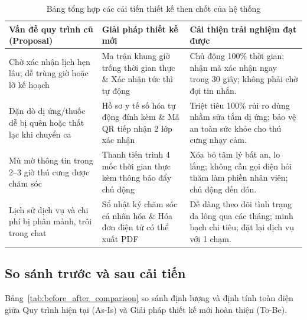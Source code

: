 \begin{table}[H]
\centering
\small
\begin{tabularx}{\textwidth}{|l|X|X|}
\hline
\textbf{Vấn đề quy trình cũ (Proposal)} & \textbf{Giải pháp thiết kế mới} & \textbf{Cải thiện trải nghiệm đạt được} \\ \hline
Chờ xác nhận lịch hẹn lâu; dễ trùng giờ hoặc lỡ kế hoạch & Ma trận khung giờ trống thời gian thực \& Xác nhận tức thì tự động & Chủ động 100\% thời gian; nhận mã xác nhận ngay trong 30 giây; không phải chờ đợi tin nhắn. \\ \hline
Dặn dò dị ứng/thuốc dễ bị quên hoặc thất lạc khi chuyển ca & Hồ sơ y tế số hóa tự động đính kèm \& Mã QR tiếp nhận 2 lớp xác nhận & Triệt tiêu 100\% rủi ro dùng nhầm sữa tắm dị ứng; bảo vệ an toàn sức khỏe cho thú cưng nhạy cảm. \\ \hline
Mù mờ thông tin trong 2--3 giờ thú cưng được chăm sóc & Thanh tiến trình 4 mốc thời gian thực kèm thông báo đẩy chủ động & Xóa bỏ tâm lý bất an, lo lắng; không cần gọi điện hỏi thăm làm phiền nhân viên; chủ động đến đón. \\ \hline
Lịch sử dịch vụ và chi phí bị phân mảnh, trôi trong chat & Sổ nhật ký chăm sóc cá nhân hóa \& Hóa đơn điện tử có thể xuất PDF & Dễ dàng theo dõi tình trạng da lông qua các tháng; minh bạch chi tiêu; đặt lại dịch vụ với 1 chạm. \\ \hline
\end{tabularx}
\caption{Bảng tổng hợp các cải tiến thiết kế then chốt của hệ thống}
\label{tab:key_design_improvements}
\end{table}

\subsection{So sánh trước và sau cải tiến}
Bảng~\ref{tab:before_after_comparison} so sánh định lượng và định tính toàn diện giữa Quy trình hiện tại (As-Is) và Giải pháp thiết kế mới hoàn thiện (To-Be).

